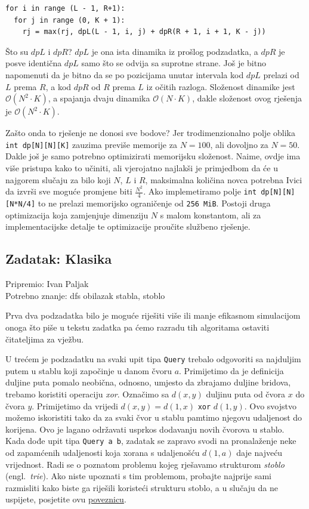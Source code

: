 \documentclass[a4paper]{article}
\begin{document}
\vspace{-2ex}
\begin{verbatim}
for i in range (L - 1, R+1):
  for j in range (0, K + 1):
    rj = max(rj, dpL(L - 1, i, j) + dpR(R + 1, i + 1, K - j))
\end{verbatim}

Što su $dpL$ i $dpR$? $dpL$ je ona ista dinamika iz prošlog podzadatka, a $dpR$
je posve identična $dpL$ samo što se odvija sa suprotne strane. Još je bitno
napomenuti da je bitno da se po pozicijama unutar intervala kod $dpL$ prelazi
od $L$ prema $R$, a kod $dpR$ od $R$ prema $L$ iz očitih razloga. Složenost
dinamike jest $\mathcal{O}(N^2 \cdot K)$, a spajanja dvaju dinamika
$\mathcal{O}(N \cdot K)$, dakle složenost ovog rješenja je $\mathcal{O}(N^2
\cdot K)$.

Zašto onda to rješenje ne donosi sve bodove? Jer trodimenzionalno polje oblika
\texttt{int dp[N][N][K]} zauzima previše memorije za $N = 100$, ali dovoljno za
$N = 50$.  Dakle još je samo potrebno optimizirati memorijsku složenost. Naime,
ovdje ima više pristupa kako to učiniti, ali vjerojatno najlakši je primjedbom
da će u najgorem slučaju za bilo koji $N$, $L$ i $R$, maksimalna količina novca
potrebna Ivici da izvrši sve moguće promjene biti $\frac{N^2}{4}$. Ako
implemetiramo polje \texttt{int dp[N][N][N*N/4]} to ne prelazi memorijsko
ograničenje od \texttt{256 MiB}. Postoji druga optimizacija koja zamjenjuje
dimenziju $N$ s malom konstantom, ali za implementacijske detalje te
optimizacije proučite službeno rješenje.

\subsection*{Zadatak: Klasika}
\textsf{Pripremio: Ivan Paljak}\\
\textsf{Potrebno znanje: dfs obilazak stabla, stoblo}

Prva dva podzadatka bilo je moguće riješiti više ili manje efikasnom simulacijom
onoga što piše u tekstu zadatka pa ćemo razradu tih algoritama ostaviti
čitateljima za vježbu.

U trećem je podzadatku na svaki upit tipa \texttt{Query} trebalo odgovoriti sa
najduljim putem u stablu koji započinje u danom čvoru $a$. Primijetimo da je
definicija duljine puta pomalo neobična, odnosno, umjesto da zbrajamo duljine
bridova, trebamo koristiti operaciju \textit{xor}. Označimo sa $d(x, y)$
duljinu puta od čvora $x$ do čvora $y$. Primijetimo da vrijedi $d(x, y) = d(1,
x)$ \texttt{xor} $d(1, y)$. Ovo svojstvo možemo iskoristiti
tako da za svaki čvor u stablu pamtimo njegovu udaljenost do korijena. Ovo je
lagano održavati usprkos dodavanju novih čvorova u stablo. Kada dođe upit tipa
\texttt{Query a b}, zadatak se zapravo svodi na pronalaženje neke od zapamćenih
udaljenosti koja xorana s udaljenošću $d(1, a)$ daje najveću vrijednost. Radi
se o poznatom problemu kojeg rješavamo strukturom \textit{stoblo} (engl.\
\textit{trie}). Ako niste upoznati s tim problemom, probajte najprije sami
razmisliti kako biste ga riješili koristeći strukturu stoblo, a u slučaju da ne
uspijete, posjetite ovu
\href{https://www.hackerearth.com/practice/notes/lalitkundu95/tutorial-on-trie-and-example-problems/}{poveznicu}.
\end{document}
